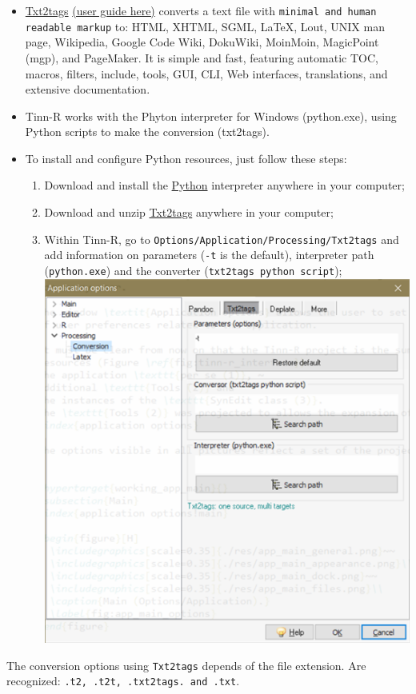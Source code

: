 \begin{itemize}
  \item \href{http://txt2tags.sourceforge.net}{Txt2tags}
    \href{http://txt2tags.sourceforge.net/userguide}{(user guide here)}
    converts a text file with \texttt{minimal and human readable markup} to:
    HTML, XHTML, SGML, \LaTeX, Lout, UNIX man page, Wikipedia, Google Code Wiki,
    DokuWiki, MoinMoin, MagicPoint (mgp), and PageMaker. It is simple and fast,
    featuring automatic TOC, macros, filters, include, tools, GUI, CLI,
    Web interfaces, translations, and extensive documentation.

  \item Tinn-R works with the Phyton interpreter for Windows (python.exe), using
    Python scripts to make the conversion (txt2tags).

  \item To install and configure Python resources, just follow these steps:
    \begin{enumerate}
      \item Download and install the
        \href{http://www.python.org/download/}{Python}
        interpreter anywhere in your computer;
      \item Download and unzip
        \href{http://txt2tags.sourceforge.net/}{Txt2tags}
        anywhere in your computer;
      \item Within Tinn-R, go to \texttt{Options/Application/Processing/Txt2tags}
        and add information on parameters (\texttt{-t} is the default),
        interpreter path (\texttt{python.exe}) and the
        converter (\texttt{txt2tags python script});\\

        \includegraphics[scale=0.50]{./res/app_processing_conversion_txt2tags.png}\\
    \end{enumerate}
\end{itemize}

The conversion options using \texttt{Txt2tags} depends of the file extension.
Are recognized: \texttt{.t2, .t2t, .txt2tags. and .txt}.
